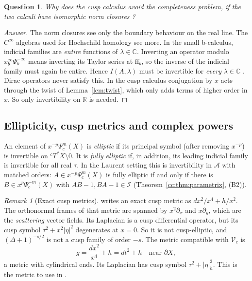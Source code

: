 \documentclass[11pt,oneside,reqno]{article}
\newcommand{\C}{\mathbb C}
\newcommand{\R}{\mathbb R}
\newcommand{\cA}{\mathcal A}
\newcommand{\cI}{\mathcal I}
\newcommand{\Psic}{\Psi_{c}}
\newcommand{\CI}{C^\infty}
\newcommand{\cT}{{}^cT^*X}
\theoremstyle{plain}
\newtheorem{question}[theorem]{Question}
\theoremstyle{definition}
\theoremstyle{remark}
\newtheorem{remark}[theorem]{Remark}
\newenvironment{answer}{\begin{proof}[Answer]}{\end{proof}}
\begin{document}
\begin{question}
Why does the cusp calculus avoid the completeness problem, if the two
calculi have isomorphic norm closures \cite[p.~3]{MN}?
\end{question}
\begin{answer}
The norm closures see only the boundary behaviour on the real line. The
\(\CI\) algebras used for Hochschild homology see more. In the small
b-calculus, indicial families are \emph{entire} functions of
\(\lambda\in\C\). Inverting an operator modulo \(x_b^\infty\Psi_b^{-\infty}\)
means inverting its Taylor series at \(\mathrm{ff}_b\), so the inverse of
the indicial family must again be entire. Hence \(I(A,\lambda)\) must be
invertible for \emph{every} \(\lambda\in\C\) \cite[Lemma
``invertible'']{HHb}. Dirac operators never satisfy this. In the cusp
calculus conjugation by \(x\) acts through the twist of
Lemma~\ref{lem:twist}, which only adds terms of higher order in \(x\). So
only invertibility on \(\R\) is needed.
\end{answer}

\subsection{Ellipticity, cusp metrics and complex powers}
\label{subsec:elliptic}
An element of \(x^{-p}\Psic^m(X)\) is \emph{elliptic} if its principal
symbol (after removing \(x^{-p}\)) is invertible on \(\cT\setminus0\). It
is \emph{fully elliptic} if, in addition, its leading indicial family is
invertible for all real \(\tau\). In the Laurent setting this is
invertibility in \(\cA\) with matched orders: \(A\in x^{-p}\Psic^m(X)\) is
fully elliptic if and only if there is \(B\in x^p\Psic^{-m}(X)\) with
\(AB-1,BA-1\in\cI\) (Theorem~\ref{cc:thm:parametrix}, (B2)).

\begin{remark}[Exact cusp metrics]\label{rem:cuspmetric}
\cite[App.~B]{MN} writes an exact cusp metric as \(dx^2/x^4+h/x^2\). The
orthonormal frames of that metric are spanned by \(x^2\partial_x\) and
\(x\partial_y\), which are the \emph{scattering} vector fields. Its
Laplacian is a cusp differential operator, but its cusp symbol
\(\tau^2+x^2|\eta|^2\) degenerates at \(x=0\). So it is not cusp-elliptic,
and \((\Delta+1)^{-s/2}\) is not a cusp family of order \(-s\). The metric
compatible with \(\mathcal V_c\) is
\[
 g=\frac{dx^2}{x^4}+h=dt^2+h\quad\text{near }\partial X ,
\]
a metric with cylindrical ends. Its Laplacian has cusp symbol
\(\tau^2+|\eta|_h^2\). This is the metric to use in \cite[\S5]{MN}.
\end{remark}
\end{document}
